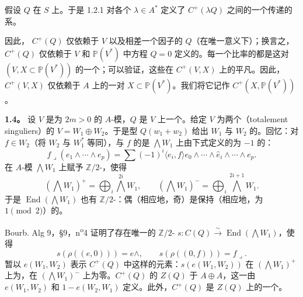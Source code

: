 假设 $Q$ 在 $S$ 上。于是 1.2.1 对各个 $\lambda\in A^*$ 定义了 $C^+(\lambda Q)$ 之间的一个传递的系。

因此， $C^+(Q)$ 仅依赖于 $V$ 以及相差一个因子的 $Q$（在唯一意义下）；换言之，$C^+(Q)$ 仅依赖于 $V$ 和 $\mathbb P(V^*)$ 中方程 $Q=0$ 定义的。每一个比率的都是这对 $(V,X\subset\mathbb P(V^*))$ 的一个；可以验证，这些在 $C^+(V,X)$ 上的平凡。因此， $C^+(V,X)$ 仅依赖于 $A$ 上的一对 $X\subset\mathbb P(V^*)$。我们将它记作 $C^+(X,\mathbb P(V^*))$。

\textbf{1.4。} 设 $V$ 是为 $2m>0$ 的 $A$-模，$Q$ 是 $V$ 上一个。给定 $V$ 为两个（totalement singuliers）的 $V=W_1\oplus W_2$。于是型 $Q(w_1+w_2)$ 给出 $W_1$ 与 $W_2$ 的。回忆：对 $f\in W_2$（将 $W_2$ 与 $W_1^*$ 等同），与 $f$ 的是 $\bigwedge W_1$ 上由下式定义的为 $-1$ 的：
\[
f\mathbin{\lrcorner}(e_1\wedge\cdots\wedge e_p)
=\sum(-1)^i\langle e_i,f\rangle e_0\wedge\cdots\wedge\widehat e_i\wedge\cdots\wedge e_p.
\]
在 $A$-模 $\bigwedge W_1$ 上赋予 $\mathbb Z/2$-，使得
\[
(\bigwedge W_1)^+=\bigoplus_i\bigwedge^{2i}W_1,
\qquad(\bigwedge W_1)^-=\bigoplus_i\bigwedge^{2i+1}W_1.
\]
于是 $\operatorname{End}(\bigwedge W_1)$ 也有 $\mathbb Z/2$-：偶（相应地，奇）是保持（相应地，为 $1\pmod2$）的。

Bourb. Alg 9，§9，n\textsuperscript{o}4 证明了存在唯一的 $\mathbb Z/2$- $s:C(Q)\xrightarrow{\sim}\operatorname{End}(\bigwedge W_1)$，使得
\[
s(\rho((e,0)))=e\wedge,\qquad s(\rho((0,f)))=f\mathbin{\lrcorner}.
\]
暂以 $e(W_1,W_2)$ 表示 $C^+(Q)$ 中这样的元素：$s(e(W_1,W_2))$ 在 $(\bigwedge W_1)^+$ 上为，在 $(\bigwedge W_1)^-$ 上为零。$C^+(Q)$ 的 $Z(Q)$ 于 $A\oplus A$，这一由 $e(W_1,W_2)$ 和 $1-e(W_2,W_1)$ 定义。此外，$C^+(Q)$ 是 $Z(Q)$ 上的一个。

